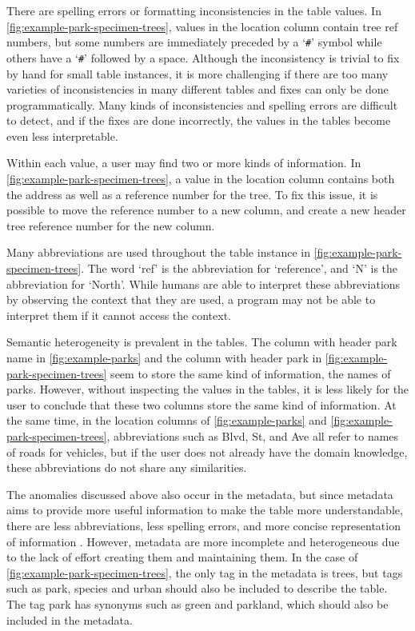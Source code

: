 There are spelling errors or formatting inconsistencies in the table values. In \autoref{fig:example-park-specimen-trees}, values in the location column contain tree ref numbers, but some numbers are immediately preceded by a `\verb+#+' symbol while others have a `\verb+#+' followed by a space. Although the inconsistency is trivial to fix by hand for small table instances, it is more challenging if there are too many varieties of inconsistencies in many different tables and fixes can only be done programmatically. Many kinds of inconsistencies and spelling errors are difficult to detect, and if the fixes are done incorrectly, the values in the tables become even less interpretable.

Within each value, a user may find two or more kinds of information. In \autoref{fig:example-park-specimen-trees}, a value in the location column contains both the address as well as a reference number for the tree. To fix this issue, it is possible to move the reference number to a new column, and create a new header tree reference number for the new column.

Many abbreviations are used throughout the table instance in \autoref{fig:example-park-specimen-trees}. The word `ref' is the abbreviation for `reference', and `N' is the abbreviation for `North'. While humans are able to interpret these abbreviations by observing the context that they are used, a program may not be able to interpret them if it cannot access the context.

Semantic heterogeneity is prevalent in the tables. The column with header park name in \autoref{fig:example-parks} and the column with header park in \autoref{fig:example-park-specimen-trees} seem to store the same kind of information, the names of parks. However, without inspecting the values in the tables, it is less likely for the user to conclude that these two columns store the same kind of information. At the same time, in the location columns of \autoref{fig:example-parks} and \autoref{fig:example-park-specimen-trees}, abbreviations such as Blvd, St, and Ave all refer to names of roads for vehicles, but if the user does not already have the domain knowledge, these abbreviations do not share any similarities.

The anomalies discussed above also occur in the metadata, but since metadata aims to provide more useful information to make the table more understandable, there are less abbreviations, less spelling errors, and more concise representation of information \cite{Rahm2016Case}. However, metadata are more incomplete and heterogeneous due to the lack of effort creating them and maintaining them. In the case of \autoref{fig:example-park-specimen-trees}, the only tag in the metadata is trees, but tags such as park, species and urban should also be included to describe the table. The tag park has synonyms such as green and parkland, which should also be included in the metadata.

